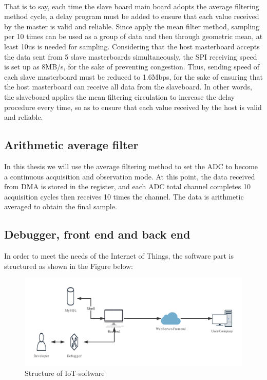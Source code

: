 \\
That is to say, each time the slave board main board adopts the average filtering method cycle, a delay program must be added to ensure that each value received by the master is valid and reliable.
Since apply the mean filter method, sampling per 10 times can be used as a group of data and then through geometric mean, at least 10us is needed for sampling. 
Considering that the host masterboard accepts the data sent from 5 slave masterboards simultaneously, the SPI receiving speed is set up as 8MB/s, for the sake of preventing congestion. 
Thus, sending speed of each slave masterboard must be reduced to 1.6Mbps, for the sake of ensuring that the host masterboard can receive all data from the slaveboard. 
In other words, the slaveboard applies the mean filtering circulation to increase the delay procedure every time, so as to ensure that each value received by the host is valid and reliable. 

\subsection{Arithmetic average filter}
\label{sec:Arithmetic average filter}

In this thesis we will use the average filtering method to set the ADC to become a continuous acquisition and observation mode\cite{huang2017development}. At this point, the data received from DMA is stored in the register, and each ADC total channel completes 10 acquisition cycles then receives 10 times the channel. The data is arithmetic averaged to obtain the final sample.

\subsection{Debugger, front end and back end}
\label{sec:Debugger, front end and back end}

In order to meet the needs of the Internet of Things, the software part is structured as shown in the Figure below:
\begin{figure}[!ht]
	\centering
	\includegraphics[width=16cm]{grafiken/5.7.pdf}
	\caption{Structure of IoT-software} 
	\label{fig:5.7}
\end{figure}
\FloatBarrier

